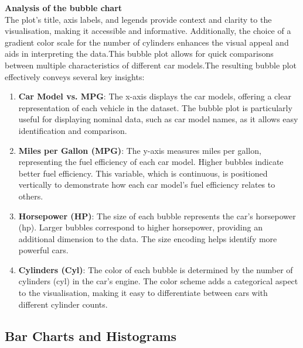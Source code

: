 \documentclass{article}\usepackage[]{graphicx}\usepackage[]{xcolor}
\begin{document}
\textbf{Analysis of the bubble chart}\\
The plot's title, axis labels, and legends provide context and clarity to the visualisation, making it accessible and informative. Additionally, the choice of a gradient color scale for the number of cylinders enhances the visual appeal and aids in interpreting the data.This bubble plot allows for quick comparisons between multiple characteristics of different car models.The resulting bubble plot effectively conveys several key insights:
\begin{enumerate}
\item \textbf{Car Model vs. MPG}: The x-axis displays the car models, offering a clear representation of each vehicle in the dataset. The bubble plot is particularly useful for displaying nominal data, such as car model names, as it allows easy identification and comparison.
\item \textbf{Miles per Gallon (MPG)}: The y-axis measures miles per gallon, representing the fuel efficiency of each car model. Higher bubbles indicate better fuel efficiency. This variable, which is continuous, is positioned vertically to demonstrate how each car model's fuel efficiency relates to others.
\item \textbf{Horsepower (HP)}: The size of each bubble represents the car's horsepower (hp). Larger bubbles correspond to higher horsepower, providing an additional dimension to the data. The size encoding helps identify more powerful cars.
\item \textbf{Cylinders (Cyl)}: The color of each bubble is determined by the number of cylinders (cyl) in the car's engine. The color scheme adds a categorical aspect to the visualisation, making it easy to differentiate between cars with different cylinder counts.
\end{enumerate}


\subsection{Bar Charts and Histograms}
\end{document}
